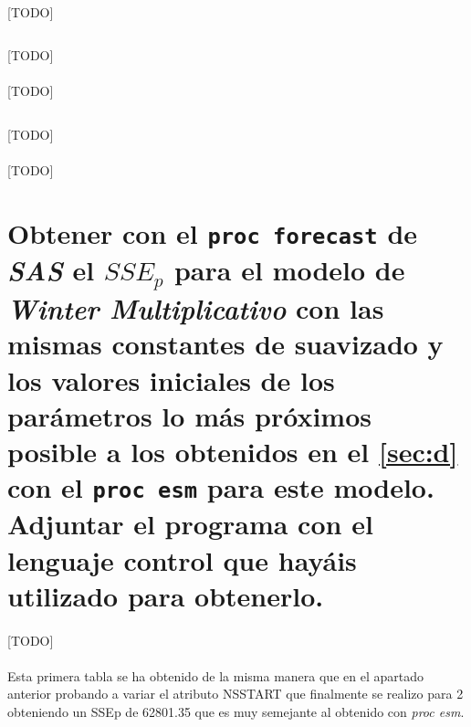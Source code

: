 \documentclass[a4paper, spanish]{article}
\begin{document}
    \paragraph{}
    [TODO]

    \begin{listing}[htb!]
      \centering
      \inputminted{SAS}{./res/code/d-02-prediction-error-esm-wintermul.sas}
      \caption{[TODO]}
      \label{code:d_prediction_error_esm_wintermul}
    \end{listing}

    \paragraph{}
    [TODO]

    \begin{listing}[htb!]
      \centering
      \inputminted{SAS}{./res/code/d-03-error-summary.sas}
      \caption{[TODO]}
      \label{code:d_summary_error}
    \end{listing}

    \paragraph{}
    [TODO]

  \section{Obtener con el \texttt{proc forecast} de \emph{SAS} el $SSE_p$ para el modelo de \emph{Winter Multiplicativo} con las mismas constantes de suavizado y los valores iniciales de los parámetros lo más próximos posible a los obtenidos en el \autoref{sec:d} con el \texttt{proc esm} para este modelo. Adjuntar el programa con el lenguaje control que hayáis utilizado para obtenerlo.}
  \label{sec:e}

    \paragraph{}
    [TODO]

    \paragraph{}
    Esta primera tabla se ha obtenido de la misma manera que en el apartado anterior probando a variar  el  atributo NSSTART que finalmente se realizo para 2 obteniendo un SSEp de 62801.35 que es muy semejante al obtenido con \textit{proc esm}.
\end{document}

